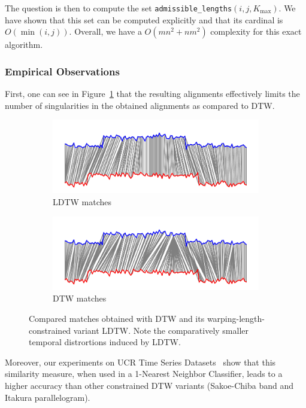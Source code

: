 The question is then to compute the set
\texttt{admissible\_lengths}$(i, j, K_\text{max})$.
We have shown that this set can be computed explicitly and that its cardinal
is $O(\min(i, j))$.
Overall, we have a $O(mn^2 + nm^2)$ complexity for this exact algorithm.

\subsubsection{Empirical Observations}

First, one can see in Figure~\ref{fig:ldtw} that the resulting alignments
effectively limits the number of singularities in the obtained alignments as
compared to DTW.

\begin{figure}[t]
    \begin{subfigure}[b]{\textwidth}
         \centering
         \includegraphics[width=.8\textwidth]{fig/dtw_warping_length}
         \caption{LDTW matches}
     \end{subfigure}
     \begin{subfigure}[b]{\textwidth}
          \centering
          \includegraphics[width=.8\textwidth]{fig/dtw_warping_length_b}
          \caption{DTW matches}
      \end{subfigure}
    \caption{Compared matches obtained with DTW and its
    warping-length-constrained variant LDTW. Note the comparatively smaller
    temporal distrortions induced by LDTW.}
    \label{fig:ldtw}
\end{figure}

Moreover, our experiments on UCR Time Series Datasets~\cite{ucr} show that
this similarity measure, when used in a 1-Nearest Neighbor Classifier, leads to
a higher accuracy than other constrained DTW variants
(Sakoe-Chiba band and Itakura parallelogram).
